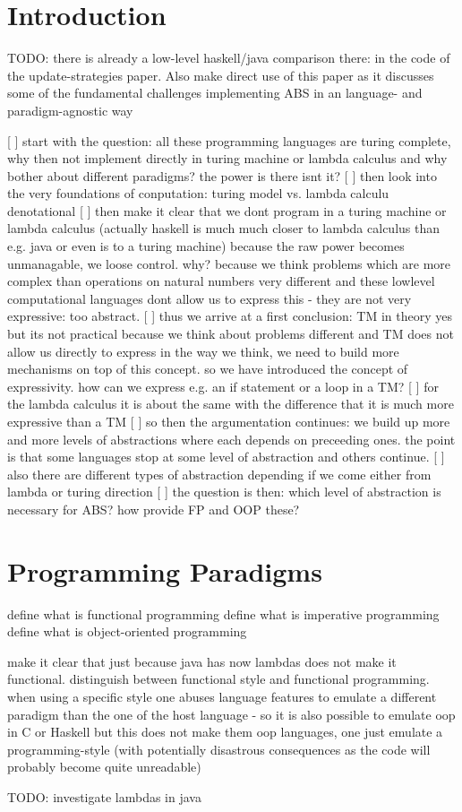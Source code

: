 \section{Introduction}
TODO: there is already a low-level haskell/java comparison there: in the code of the update-strategies paper. Also make direct use of this paper as it discusses some of the fundamental challenges implementing ABS in an language- and paradigm-agnostic way

[ ] start with the question: all these programming languages are turing complete, why then not implement directly in turing machine or lambda calculus and why bother about different paradigms? the power is there isnt it?
[ ] then look into the very foundations of conputation: turing model vs. lambda calculu denotational
[ ] then make it clear that we dont program in a turing machine or lambda calculus (actually haskell is much much closer to lambda calculus than e.g. java or even is to a turing machine) because the raw power becomes unmanagable, we loose control. why? because we think problems which are more complex than operations on natural numbers very different and these lowlevel computational languages dont allow us to express this - they are not very expressive: too abstract.
[ ] thus we arrive at a first conclusion: TM in theory yes but its not practical because we think about problems different and TM does not allow us directly to express in the way we think, we need to build  more mechanisms on top of this concept. so we have introduced the concept of expressivity. how can we express e.g. an if statement or a loop in a TM? 
[ ] for the lambda calculus it is about the same with the difference that it is much more expressive than a TM
[ ] so then the argumentation continues: we build up more and more levels of abstractions where each depends on preceeding ones. the point is that some languages stop at some level of abstraction and others continue.
[ ] also there are different types of abstraction depending if we come either from lambda or turing direction 
[ ] the question is then: which level of abstraction is necessary for ABS? how provide FP and OOP these?

\section{Programming Paradigms}
define what is functional programming
define what is imperative programming
define what is object-oriented programming

make it clear that just because java has now lambdas does not make it functional. 
distinguish between functional style and functional programming. when using a specific style one abuses language features to emulate a different paradigm than the one of the host language - so it is also possible to emulate oop in C or Haskell but this does not make them oop languages, one just emulate a programming-style (with potentially disastrous consequences as the code will probably become quite unreadable)

TODO: investigate lambdas in java